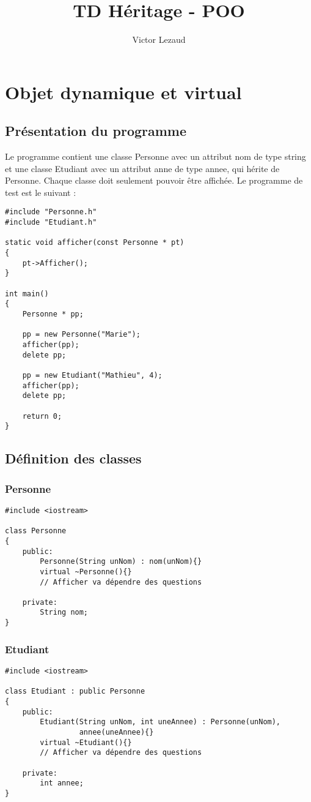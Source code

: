 \documentclass[10pt,a4paper,twoside]{article}
\title{TD Héritage - POO}
\author{Victor Lezaud}
\begin{document}
\maketitle
\renewcommand{\contentsname}{Sommaire}
\tableofcontents

\newpage

\section{Objet dynamique et virtual}
\subsection{Présentation du programme}
Le programme contient une classe Personne avec un attribut nom de type string et une classe Etudiant avec un attribut anne de type annee, qui hérite de Personne. Chaque classe doit seulement pouvoir être affichée. Le programme de test est le suivant :
\begin{verbatim}
#include "Personne.h"
#include "Etudiant.h"

static void afficher(const Personne * pt)
{
    pt->Afficher();
}

int main()
{
    Personne * pp;
    
    pp = new Personne("Marie");
    afficher(pp);
    delete pp;
    
    pp = new Etudiant("Mathieu", 4);
    afficher(pp);
    delete pp;
    
    return 0;
}
\end{verbatim}


\subsection{Définition des classes}
\subsubsection{Personne}
\begin{verbatim}
#include <iostream>

class Personne
{
    public:
        Personne(String unNom) : nom(unNom){}
        virtual ~Personne(){}
        // Afficher va dépendre des questions
		
    private:
        String nom;
}       
\end{verbatim}

\subsubsection{Etudiant}
\begin{verbatim}
#include <iostream>

class Etudiant : public Personne
{
    public:
        Etudiant(String unNom, int uneAnnee) : Personne(unNom),
                 annee(uneAnnee){}
        virtual ~Etudiant(){}
        // Afficher va dépendre des questions
		
    private:
        int annee;
}       
\end{verbatim}
\end{document}
